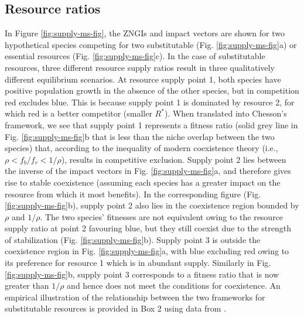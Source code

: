 \subsection{Resource ratios}
In Figure \ref{fig:supply-ms-fig}, the ZNGIs and impact vectors are shown for two hypothetical species competing for two substitutable (Fig. \ref{fig:supply-ms-fig}a) or essential resources (Fig. \ref{fig:supply-ms-fig}c). In the case of substitutable resources, three different resource supply ratios result in three qualitatively different equilibrium scenarios. At resource supply point 1, both species have positive population growth in the absence of the other species, but in competition red excludes blue. This is because supply point 1 is dominated by resource 2, for which red is a better competitor (smaller $R^{*}$). When translated into Chesson's framework, we see that supply point 1 represents a fitness ratio (solid grey line in Fig. \ref{fig:supply-ms-fig}b that is less than the niche overlap between the two species) that, according to the inequality of modern coexistence theory (i.e., $\rho<f_{b}/f_{r}<1/\rho$), results in competitive exclusion. Supply point 2 lies between the inverse of the impact vectors in Fig. \ref{fig:supply-ms-fig}a, and therefore gives rise to stable coexistence (assuming each species has a greater impact on the resource from which it most benefits). In the corresponding figure  (Fig. \ref{fig:supply-ms-fig}b), supply point 2 also lies in the coexistence region bounded by $\rho$ and $1/\rho$. The two species' fitnesses are not equivalent owing to the resource supply ratio at point 2 favouring blue, but they still coexist due to the strength of stabilization (Fig. \ref{fig:supply-ms-fig}b). Supply point 3 is outside the coexistence region in Fig. \ref{fig:supply-ms-fig}a, with blue excluding red owing to its preference for resource 1 which is in abundant supply. Similarly in Fig. \ref{fig:supply-ms-fig}b, supply point 3 corresponds to a fitness ratio that is now greater than $1/\rho$ and hence does not meet the conditions for coexistence. An empirical illustration of the relationship between the two frameworks for substitutable resources is provided in Box 2 using data from \citet{Rothhaupt1988}.
\par



